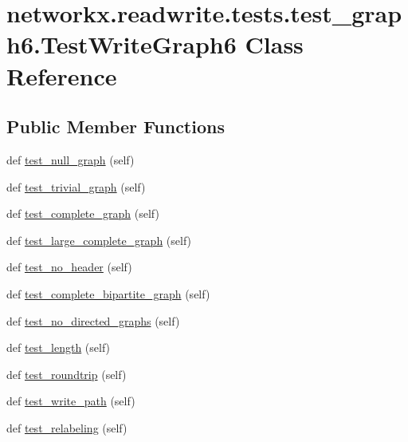 \hypertarget{classnetworkx_1_1readwrite_1_1tests_1_1test__graph6_1_1TestWriteGraph6}{}\section{networkx.\+readwrite.\+tests.\+test\+\_\+graph6.\+Test\+Write\+Graph6 Class Reference}
\label{classnetworkx_1_1readwrite_1_1tests_1_1test__graph6_1_1TestWriteGraph6}
\subsection*{Public Member Functions}
\begin{DoxyCompactItemize}
\item 
def \hyperlink{classnetworkx_1_1readwrite_1_1tests_1_1test__graph6_1_1TestWriteGraph6_a8d6b2e1215f878c12522f79a7bc0bd14}{test\+\_\+null\+\_\+graph} (self)
\item 
def \hyperlink{classnetworkx_1_1readwrite_1_1tests_1_1test__graph6_1_1TestWriteGraph6_a0df7edcf8b3792b2eb9666db52149a92}{test\+\_\+trivial\+\_\+graph} (self)
\item 
def \hyperlink{classnetworkx_1_1readwrite_1_1tests_1_1test__graph6_1_1TestWriteGraph6_adc061274f1367108d44f86c3adde6cbc}{test\+\_\+complete\+\_\+graph} (self)
\item 
def \hyperlink{classnetworkx_1_1readwrite_1_1tests_1_1test__graph6_1_1TestWriteGraph6_a058b79ab4d5a6105c3094eebd4618cfe}{test\+\_\+large\+\_\+complete\+\_\+graph} (self)
\item 
def \hyperlink{classnetworkx_1_1readwrite_1_1tests_1_1test__graph6_1_1TestWriteGraph6_a4539ae7786de480bdc585d42b6ec9d02}{test\+\_\+no\+\_\+header} (self)
\item 
def \hyperlink{classnetworkx_1_1readwrite_1_1tests_1_1test__graph6_1_1TestWriteGraph6_ad4e416d36ecd2d0330ae315b60e4bdeb}{test\+\_\+complete\+\_\+bipartite\+\_\+graph} (self)
\item 
def \hyperlink{classnetworkx_1_1readwrite_1_1tests_1_1test__graph6_1_1TestWriteGraph6_a0890a62d61c2439694901a96a8b11cbd}{test\+\_\+no\+\_\+directed\+\_\+graphs} (self)
\item 
def \hyperlink{classnetworkx_1_1readwrite_1_1tests_1_1test__graph6_1_1TestWriteGraph6_a3c5068b340dadd663f730d190bfc322a}{test\+\_\+length} (self)
\item 
def \hyperlink{classnetworkx_1_1readwrite_1_1tests_1_1test__graph6_1_1TestWriteGraph6_ae0218a4ca7251b30e5cc57a392b428df}{test\+\_\+roundtrip} (self)
\item 
def \hyperlink{classnetworkx_1_1readwrite_1_1tests_1_1test__graph6_1_1TestWriteGraph6_a6a3a8de632d4dc34c3d6ffe5c738aaf6}{test\+\_\+write\+\_\+path} (self)
\item 
def \hyperlink{classnetworkx_1_1readwrite_1_1tests_1_1test__graph6_1_1TestWriteGraph6_a901b9535903caf2ad288bb5e6f3ac820}{test\+\_\+relabeling} (self)
\end{DoxyCompactItemize}


